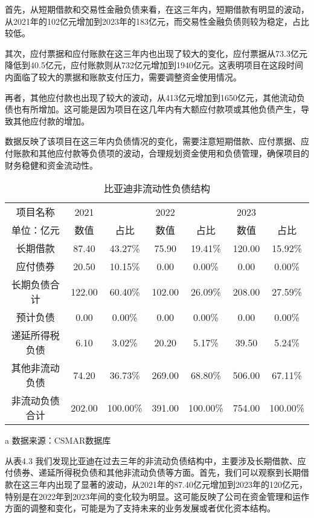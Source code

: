 首先，从短期借款和交易性金融负债来看，在这三年内，短期借款有明显的波动，从2021年的102亿元增加到2023年的183亿元，而交易性金融负债则较为稳定，占比较低。

其次，应付票据和应付账款在这三年内也出现了较大的变化，应付票据从73.3亿元降低到40.5亿元，应付账款则从732亿元增加到1940亿元。这表明项目在这段时间内面临了较大的票据和账款支付压力，需要调整资金使用情况。

再者，其他应付款也出现了较大的波动，从413亿元增加到1650亿元，其他流动负债也有所增加。这可能是因为项目在这几年内有大额应付款项或其他负债产生，导致其他应付款的增加。

数据反映了该项目在这三年内负债情况的变化，需要注意短期借款、应付票据、应付账款和其他应付款等负债项的波动，合理规划资金使用和负债管理，确保项目的财务稳健和资金流动性。

\begin{table}
  \centering
  \begin{threeparttable}[c]
    \caption{比亚迪非流动性负债结构}
    \label{tab:stable-liabilities}
    \begin{tabular}{ccccccc}
      \toprule
      项目名称 & 2021 & ~ & 2022 & ~ & 2023 & ~ \\ 
        单位：亿元 & 数值 & 占比 & 数值 & 占比 & 数值 & 占比 \\ 
      \midrule
        长期借款 & 87.40  & 43.27\% & 75.90  & 19.41\% & 120.00  & 15.92\% \\ 
        应付债券 & 20.50  & 10.15\% & 0.00  & 0.00\% & 0.00  & 0.00\% \\ 
        长期负债合计 & 122.00  & 60.40\% & 102.00  & 26.09\% & 208.00  & 27.59\% \\ 
        预计负债 & 0.00  & 0.00\% & 0.00  & 0.00\% & 0.00  & 0.00\% \\ 
        递延所得税负债 & 6.10  & 3.02\% & 20.20  & 5.17\% & 39.50  & 5.24\% \\ 
        其他非流动负债 & 74.20  & 36.73\% & 269.00  & 68.80\% & 506.00  & 67.11\% \\ 
        非流动负债合计 & 202.00  & 100.00\% & 391.00  & 100.00\% & 754.00  & 100.00\% \\ 
      \bottomrule
    \end{tabular}
    \begin{tablenotes}
      \item [a] 数据来源：CSMAR数据库
    \end{tablenotes}
  \end{threeparttable}
\end{table}
从表4.3 我们发现比亚迪在过去三年的非流动负债结构中，主要涉及长期借款、应付债券、递延所得税负债和其他非流动负债等方面。首先，我们可以观察到长期借款在这三年内出现了显著的波动，从2021年的87.40亿元增加到2023年的120亿元，特别是在2022年到2023年间的变化较为明显。这可能反映了公司在资金管理和运作方面的调整和变化，可能是为了支持未来的业务发展或者优化资本结构。

